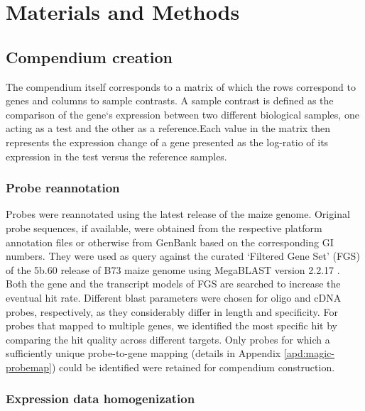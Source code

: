 \section{Materials and Methods}

\subsection{Compendium creation}

The compendium itself corresponds to a matrix of which the rows correspond 
to genes and columns to sample contrasts. A sample contrast is
defined as the comparison of the gene`s expression between two different
biological samples, one acting as a test and the other as a reference.Each
value in the matrix then represents the expression change of a gene presented 
as the log-ratio of its expression in the test versus the reference
samples.

\subsubsection{Probe reannotation} Probes were reannotated using the latest
release of the maize genome. Original probe sequences, if available, were
obtained from the respective platform annotation files or otherwise from
GenBank based on the corresponding GI numbers. They were used as
query against the curated ‘Filtered Gene Set’ (FGS) of the 5b.60 release
of B73 maize genome using MegaBLAST version 2.2.17 \cite{Zhang2000}. Both the 
gene and the transcript models of FGS are searched to
increase the eventual hit rate. Different blast parameters were chosen for
oligo and cDNA probes, respectively, as they considerably differ in length
and specificity. For probes that mapped to multiple genes, we identified
the most specific hit by comparing the hit quality across different targets.
Only probes for which a sufficiently unique probe-to-gene mapping (details 
in Appendix \ref{apd:magic-probemap}) could be identified were retained for
compendium construction.

\subsubsection{Expression data homogenization}

